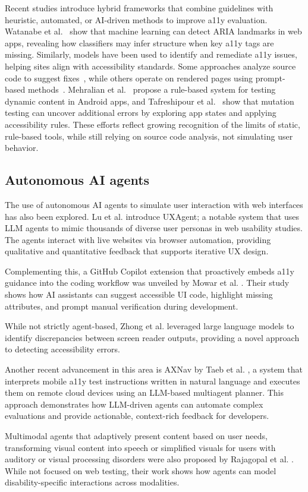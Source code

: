 Recent studies introduce hybrid frameworks that combine guidelines with heuristic, automated, or AI-driven methods to improve a11y evaluation. Watanabe et al.~\cite{watanabe2024accessibility} show that machine learning can detect ARIA landmarks in web apps, revealing how classifiers may infer structure when key \ac{a11y} tags are missing. Similarly, models have been used to identify and remediate \ac{a11y} issues, helping sites align with accessibility standards. Some approaches analyze source code to suggest fixes~\cite{ramineni2024leveraging, kuszczynski2023comparative}, while others operate on rendered pages using prompt-based methods~\cite{he2025enhancing}. Mehralian et al.~\cite{mehralian2025automated} propose a rule-based system for testing dynamic content in Android apps, and Tafreshipour et al.~\cite{tafreshipour2024ma11y} show that mutation testing can uncover additional errors by exploring app states and applying accessibility rules. These efforts reflect growing recognition of the limits of static, rule-based tools, while still relying on source code analysis, not simulating user behavior.


\subsection{Autonomous AI agents}

The use of autonomous \ac{AI} agents to simulate user interaction with web interfaces has also been explored. Lu et al. \cite{lu2025uxagent} introduce UXAgent; a notable system that uses LLM agents to mimic thousands of diverse user personas in web usability studies. The agents interact with live websites via browser automation, providing qualitative and quantitative feedback that supports iterative UX design. 

Complementing this, a GitHub Copilot extension that proactively embeds \ac{a11y} guidance into the coding workflow was unveiled by Mowar et al. \cite{mowar2025codea11y}. Their study shows how \ac{AI} assistants can suggest accessible \ac{UI} code, highlight missing attributes, and prompt manual verification during development.

While not strictly agent-based, Zhong et al. \cite{zhong2025screenaudit} leveraged large language models to identify discrepancies between screen reader outputs, providing a novel approach to detecting accessibility errors.

Another recent advancement in this area is AXNav by Taeb et al. \cite{taeb2024axnav}, a system that interprets mobile \ac{a11y} test instructions written in natural language and executes them on remote cloud devices using an LLM-based multiagent planner. This approach demonstrates how LLM-driven agents can automate complex evaluations and provide actionable, context-rich feedback for developers.

Multimodal agents that adaptively present content based on user needs, transforming visual content into speech or simplified visuals for users with auditory or visual processing disorders were also proposed by Rajagopal et al. \cite{rajagopal2023design}. While not focused on web testing, their work shows how agents can model disability-specific interactions across modalities.

